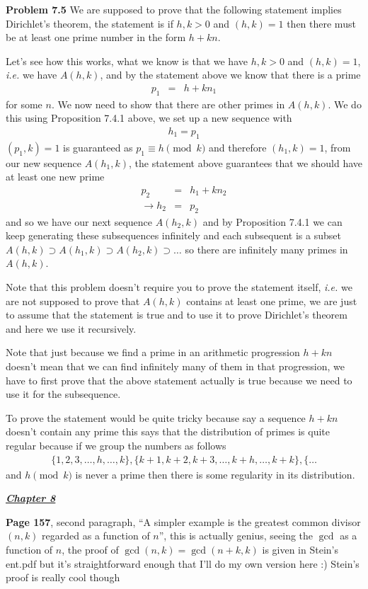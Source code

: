 \documentclass[aps,preprint,preprintnumbers,nofootinbib,showpacs,prd]{revtex4-1}
\newcommand{\ie}{{\it i.e.} }
\newcommand{\nbea}{\begin{eqnarray*}}
\newcommand{\neea}{\end{eqnarray*}}
\begin{document}
{\bf Problem 7.5} We are supposed to prove that the following statement implies Dirichlet's theorem, the statement is if $h,k > 0$ and $(h,k) = 1$ then there must be at least one prime number in the form $h + kn$.

Let's see how this works, what we know is that we have $h,k > 0$ and $(h,k) = 1$, \ie we have $A(h,k)$, and by the statement above we know that there is a prime
%
\nbea
p_1 & = & h + kn_1
\neea
%
for some $n$. We now need to show that there are other primes in $A(h,k)$. We do this using Proposition 7.4.1 above, we set up a new sequence with
%
\nbea
h_1 = p_1
\neea
%
$(p_1,k) = 1$ is guaranteed as $p_1 \equiv h \pmod{k}$ and therefore $(h_1, k) = 1$, from our new sequence $A(h_1, k)$, the statement above guarantees that we should have at least one new prime
%
\nbea
p_2 & = & h_1 + kn_2 \\
\to h_2 & = & p_2
\neea
%
and so we have our next sequence $A(h_2, k)$ and by Proposition 7.4.1 we can keep generating these subsequences infinitely and each subsequent is a subset $A(h,k) \supset A(h_1,k) \supset A(h_2,k) \supset \dots$ so there are infinitely many primes in $A(h,k)$.

Note that this problem doesn't require you to prove the statement itself, \ie we are not supposed to prove that $A(h,k)$ contains at least one prime, we are just to assume that the statement is true and to use it to prove Dirichlet's theorem and here we use it recursively.

Note that just because we find a prime in an arithmetic progression $h + kn$ doesn't mean that we can find infinitely many of them in that progression, we have to first prove that the above statement actually is true because we need to use it for the subsequence.

To prove the statement would be quite tricky because say a sequence $h + kn$ doesn't contain any prime this says that the distribution of primes is quite regular because if we group the numbers as follows
%
\nbea
\{1,2,3,\dots,h,\dots,k\},\{k+1,k+2,k+3,\dots,k+h,\dots,k+k\}, \{\dots
\neea
%
and $h \pmod{k}$ is never a prime then there is some regularity in its distribution.


\bigskip
\underline{\textbf{\textit{Chapter 8}}}
\bigskip

{\bf Page 157}, second paragraph, ``A simpler example is the greatest common divisor $(n,k)$ regarded as a function of $n$'', this is actually genius, seeing the $\gcd$ as a function of $n$, the proof of $\gcd(n,k) = \gcd(n+k,k)$ is given in Stein's ent.pdf but it's straightforward enough that I'll do my own version here :) Stein's proof is really cool though
\end{document}
